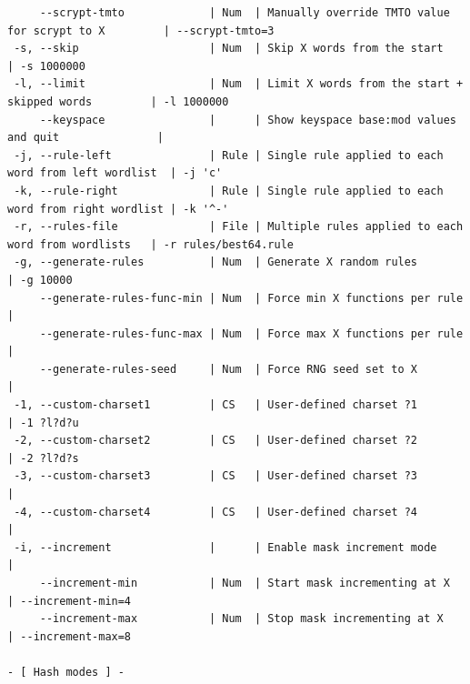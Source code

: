 \documentclass{article}
\begin{document}
\begin{lstlisting}
     --scrypt-tmto             | Num  | Manually override TMTO value for scrypt to X         | --scrypt-tmto=3
 -s, --skip                    | Num  | Skip X words from the start                          | -s 1000000
 -l, --limit                   | Num  | Limit X words from the start + skipped words         | -l 1000000
     --keyspace                |      | Show keyspace base:mod values and quit               |
 -j, --rule-left               | Rule | Single rule applied to each word from left wordlist  | -j 'c'
 -k, --rule-right              | Rule | Single rule applied to each word from right wordlist | -k '^-'
 -r, --rules-file              | File | Multiple rules applied to each word from wordlists   | -r rules/best64.rule
 -g, --generate-rules          | Num  | Generate X random rules                              | -g 10000
     --generate-rules-func-min | Num  | Force min X functions per rule                       |
     --generate-rules-func-max | Num  | Force max X functions per rule                       |
     --generate-rules-seed     | Num  | Force RNG seed set to X                              |
 -1, --custom-charset1         | CS   | User-defined charset ?1                              | -1 ?l?d?u
 -2, --custom-charset2         | CS   | User-defined charset ?2                              | -2 ?l?d?s
 -3, --custom-charset3         | CS   | User-defined charset ?3                              |
 -4, --custom-charset4         | CS   | User-defined charset ?4                              |
 -i, --increment               |      | Enable mask increment mode                           |
     --increment-min           | Num  | Start mask incrementing at X                         | --increment-min=4
     --increment-max           | Num  | Stop mask incrementing at X                          | --increment-max=8

- [ Hash modes ] -


\end{lstlisting}
\end{document}
